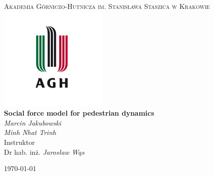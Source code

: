 \begin{titlepage}
	\centering
	{\scshape\LARGE Akademia Górniczo-Hutnicza im. Stanisława Staszica w Krakowie \\}
	\includegraphics{logoUniversity.jpg}\\
	\vspace{1cm}
	\vspace{1cm}
	{\huge\bfseries Social force model for pedestrian dynamics\\}
	\vspace{2cm}
	{\Large\itshape 
		Marcin Jakubowski\\
		Minh Nhat Trinh\\
	}
	\vfill
	Instruktor\\
	Dr hab. inż. {\it Jarosław Wąs}
	\vfill

	{\large \today\\}
\end{titlepage}
